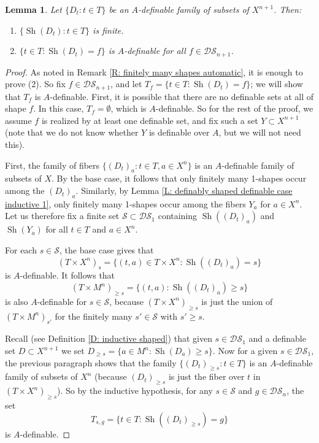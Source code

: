 \documentclass{amsart}
\newtheorem{lemma}[theorem]{Lemma}
\theoremstyle{definition}
\begin{document}
\begin{lemma}\label{L: definably shaped definable inductive 2}
    Let $\{D_t:t\in T\}$ be an $A$-definable family of subsets of $X^{n+1}$. Then:
    \begin{enumerate}
        \item $\{\operatorname{Sh}(D_t):t\in T\}$ is finite.
        \item $\{t\in T:\operatorname{Sh}(D_t)=f\}$ is $A$-definable for all $f\in\mathcal{DS}_{n+1}$.
    \end{enumerate}
\end{lemma}
\begin{proof}
    As noted in Remark \ref{R: finitely many shapes automatic}, it is enough to prove (2). So fix $f\in\mathcal{DS}_{n+1}$, and let $T_f=\{t\in T:\operatorname{Sh}(D_t)=f\}$; we will show that $T_f$ is $A$-definable. First, it is possible that there are no definable sets at all of shape $f$. In this case, $T_f=\emptyset$, which is $A$-definable. So for the rest of the proof, we assume $f$ is realized by at least one definable set, and fix such a set $Y\subset X^{n+1}$ (note that we do not know whether $Y$ is definable over $A$, but we will not need this).
    
    First, the family of fibers $\{(D_t)_a:t\in T,a\in X^n\}$ is an $A$-definable family of subsets of $X$. By the base case, it follows that only finitely many 1-shapes occur among the $(D_t)_a$. Similarly, by Lemma \ref{L: definably shaped definable case inductive 1}, only finitely many 1-shapes occur among the fibers $Y_a$ for $a\in X^n$. Let us therefore fix a finite set $\mathcal S\subset\mathcal{DS}_1$ containing $\operatorname{Sh}((D_t)_a)$ and $\operatorname{Sh}(Y_a)$ for all $t\in T$ and $a\in X^n$.
    
    For each $s\in\mathcal S$, the base case gives that $$(T\times X^n)_s=\{(t,a)\in T\times X^n:\operatorname{Sh}((D_t)_a)=s\}$$ is $A$-definable. It follows that $$(T\times M^n)_{\geq s}=\{(t,a):\operatorname{Sh}((D_t)_a)\geq s\}$$ is also $A$-definable for $s\in\mathcal S$, because $(T\times X^n)_{\geq s}$ is just the union of $(T\times M^n)_{s'}$ for the finitely many $s'\in\mathcal S$ with $s'\geq s$.
    
    Recall (see Definition \ref{D: inductive shaped}) that given $s\in\mathcal{DS}_1$ and a definable set $D\subset X^{n+1}$ we set $D_{\geq s}=\{a\in M^n:\operatorname{Sh}(D_a)\geq s\}$. Now for a given $s\in\mathcal{DS}_1$, the previous paragraph shows that the family $\{(D_t)_{\geq s}:t\in T\}$ is an $A$-definable family of subsets of $X^n$ (because $(D_t)_{\geq s}$ is just the fiber over $t$ in $(T\times X^n)_{\geq s}$). So by the inductive hypothesis, for any $s\in\mathcal S$ and $g\in\mathcal{DS}_n$, the set $$T_{s,g}=\{t\in T:\operatorname{Sh}((D_t)_{\geq s})=g\}$$ is $A$-definable.
    

\end{proof}
\end{document}
